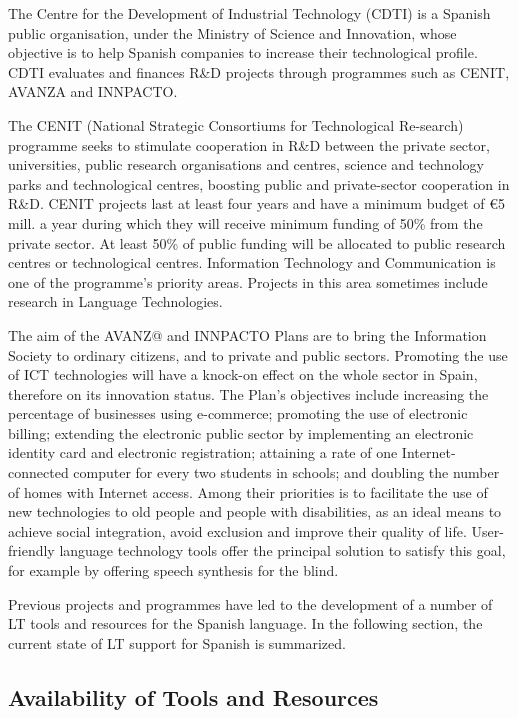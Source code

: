 \begin{multicols}{2}
The Centre for the Development of Industrial Technology (CDTI) is a Spanish public organisation, under the Ministry of Science and Innovation, whose objective is to help Spanish companies to increase their technological profile. CDTI evaluates and finances R\&D projects through programmes such as CENIT, AVANZA and INNPACTO.

The CENIT (National Strategic Consortiums for Technological Re-search) programme seeks to stimulate cooperation in R\&D between the private sector, universities, public research organisations and centres, science and technology parks and technological centres, boosting public and private-sector cooperation in R\&D. CENIT projects last at least four years and have a minimum budget of €5 mill. a year during which they will receive minimum funding of 50\% from the private sector. At least 50\% of public funding will be allocated to public research centres or technological centres. Information Technology and Communication is one of the programme’s priority areas. Projects in this area sometimes include research in Language Technologies. 

The aim of the AVANZ@ and INNPACTO Plans are to bring the Information Society to ordinary citizens, and to private and public sectors. Promoting the use of ICT technologies will have a knock-on effect on the whole sector in Spain, therefore on its innovation status. The Plan’s objectives include increasing the percentage of businesses using e-commerce; promoting the use of electronic billing; extending the electronic public sector by implementing an electronic identity card and electronic registration; attaining a rate of one Internet-connected computer for every two students in schools; and doubling the number of homes with Internet access. Among their priorities is to facilitate the use of new technologies to old people and people with disabilities, as an ideal means to achieve social integration, avoid exclusion and improve their quality of life. User-friendly language technology tools offer the principal solution to satisfy this goal, for example by offering speech synthesis for the blind.

Previous projects and programmes have led to the development of a number of LT tools and resources for the Spanish language. In the following section, the current state of LT support for Spanish is summarized.  

\subsection{Availability of Tools and Resources}


\end{multicols}
